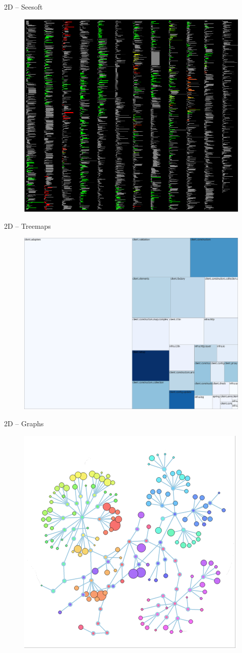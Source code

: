 \documentclass[handout]{beamer}
\begin{document}
\begin{frame}{2D -- Seesoft}
    \begin{figure}
    \includegraphics[width=.54\textwidth]{../figures/eick1992seesoft}
    \end{figure}
\end{frame}

\begin{frame}{2D -- Treemaps}
    \begin{figure}
    \includegraphics[width=.7\textwidth]{../figures/shneiderman1992tree}
    \end{figure}
\end{frame}

\begin{frame}{2D -- Graphs}
    \begin{figure}
    \includegraphics[width=.55\textwidth]{../figures/zaninotto2013codeflowers}
    \end{figure}
\end{frame}
\end{document}
